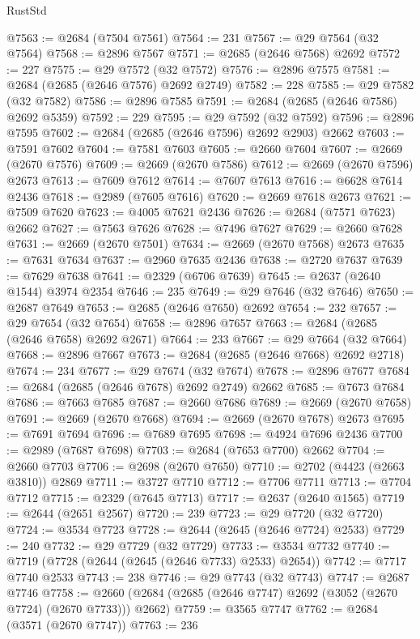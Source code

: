 \begin{lexlean}{RustStd}
\begin{coremodule}
@7563 := @2684 (@7504 @7561)
@7564 := 231
@7567 := @29 @7564 (@32 @7564)
@7568 := @2896 @7567
@7571 := @2685 (@2646 @7568) @2692
@7572 := 227
@7575 := @29 @7572 (@32 @7572)
@7576 := @2896 @7575
@7581 := @2684 (@2685 (@2646 @7576) @2692 @2749)
@7582 := 228
@7585 := @29 @7582 (@32 @7582)
@7586 := @2896 @7585
@7591 := @2684 (@2685 (@2646 @7586) @2692 @5359)
@7592 := 229
@7595 := @29 @7592 (@32 @7592)
@7596 := @2896 @7595
@7602 := @2684 (@2685 (@2646 @7596) @2692 @2903) @2662
@7603 := @7591 @7602
@7604 := @7581 @7603
@7605 := @2660 @7604
@7607 := @2669 (@2670 @7576)
@7609 := @2669 (@2670 @7586)
@7612 := @2669 (@2670 @7596) @2673
@7613 := @7609 @7612
@7614 := @7607 @7613
@7616 := @6628 @7614 @2436
@7618 := @2989 (@7605 @7616)
@7620 := @2669 @7618 @2673
@7621 := @7509 @7620
@7623 := @4005 @7621 @2436
@7626 := @2684 (@7571 @7623) @2662
@7627 := @7563 @7626
@7628 := @7496 @7627
@7629 := @2660 @7628
@7631 := @2669 (@2670 @7501)
@7634 := @2669 (@2670 @7568) @2673
@7635 := @7631 @7634
@7637 := @2960 @7635 @2436
@7638 := @2720 @7637
@7639 := @7629 @7638
@7641 := @2329 (@6706 @7639)
@7645 := @2637 (@2640 @1544) @3974 @2354
@7646 := 235
@7649 := @29 @7646 (@32 @7646)
@7650 := @2687 @7649
@7653 := @2685 (@2646 @7650) @2692
@7654 := 232
@7657 := @29 @7654 (@32 @7654)
@7658 := @2896 @7657
@7663 := @2684 (@2685 (@2646 @7658) @2692 @2671)
@7664 := 233
@7667 := @29 @7664 (@32 @7664)
@7668 := @2896 @7667
@7673 := @2684 (@2685 (@2646 @7668) @2692 @2718)
@7674 := 234
@7677 := @29 @7674 (@32 @7674)
@7678 := @2896 @7677
@7684 := @2684 (@2685 (@2646 @7678) @2692 @2749) @2662
@7685 := @7673 @7684
@7686 := @7663 @7685
@7687 := @2660 @7686
@7689 := @2669 (@2670 @7658)
@7691 := @2669 (@2670 @7668)
@7694 := @2669 (@2670 @7678) @2673
@7695 := @7691 @7694
@7696 := @7689 @7695
@7698 := @4924 @7696 @2436
@7700 := @2989 (@7687 @7698)
@7703 := @2684 (@7653 @7700) @2662
@7704 := @2660 @7703
@7706 := @2698 (@2670 @7650)
@7710 := @2702 (@4423 (@2663 @3810)) @2869
@7711 := @3727 @7710
@7712 := @7706 @7711
@7713 := @7704 @7712
@7715 := @2329 (@7645 @7713)
@7717 := @2637 (@2640 @1565)
@7719 := @2644 (@2651 @2567)
@7720 := 239
@7723 := @29 @7720 (@32 @7720)
@7724 := @3534 @7723
@7728 := @2644 (@2645 (@2646 @7724) @2533)
@7729 := 240
@7732 := @29 @7729 (@32 @7729)
@7733 := @3534 @7732
@7740 := @7719 (@7728 (@2644 (@2645 (@2646 @7733) @2533) @2654))
@7742 := @7717 @7740 @2533
@7743 := 238
@7746 := @29 @7743 (@32 @7743)
@7747 := @2687 @7746
@7758 := @2660 (@2684 (@2685 (@2646 @7747) @2692 (@3052 (@2670 @7724) (@2670 @7733))) @2662)
@7759 := @3565 @7747
@7762 := @2684 (@3571 (@2670 @7747))
@7763 := 236

\end{coremodule}
\end{lexlean}
